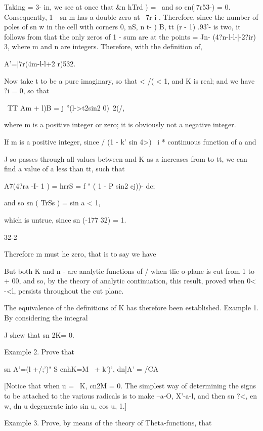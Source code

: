 Taking = 3- in, we see at once that \&n hTrd ) = \ and so
cn(|7r53-) = 0. Consequently, 1 - sn m has a double zero at \ 7r i .
Therefore, since the number of poles of sn w in the cell with corners
0, nS, n t- ) B, tt (r - 1) .93'- is two, it follows from
that the only zeros of 1 - sum are at the points = Jn-
(4?n-l-l-|-2?ir) 3, where m and n are integers. Therefore, with the
definition of,

A'=|7r(4m-l-l+2 r)532.

Now take t to be a pure imaginary, so that < /( < 1, and K is real;
and we have ?i = 0, so that

\ TT Am + l)B = j ''(l->t2sin2 0)~2(/,

where m is a positive integer or zero; it is obviously not a negative
integer.

If m is a positive integer, since / (1 - k' sin 4>)~ i * continuous
function of a and

J so passes through all values between and K as a increases from to
tt, we can find a value of a less than tt, such that

A7(4?ra -I- 1 ) = hrrS = f " ( 1 - P sin2 cj))- dc;

and so sn ( TrSs ) = sin a < 1,

which is untrue, since sn (-177 32) = 1.

32-2

%
%

Therefore m must he zero, that is to say we have

But both K and n - are analytic functions of / when tlie o-plane is
cut from 1 to + 00, and so, by the theory of analytic continuation,
this result, proved when 0< -<l, persists throughout the cut plane.

The equivalence of the definitions of K has therefore been
established. Example 1. By considering the integral

J shew that sn 2K= 0.

Example 2. Prove that

sn A'=(l +/;')" S cnhK=M \ + k')', dn|A' = /CA

[Notice that when u = \ K, cn2M = 0. The simplest way of determining
the signs to be attached to the various radicals is to make --a-O,
X'-a-l, and then sn ?<, en w, dn u degenerate into sin u, cos u, 1.]

Example 3. Prove, by means of the theory of Theta-functions, that

